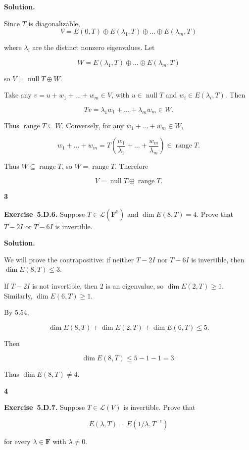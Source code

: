 \documentclass[11pt]{article}
\newcommand{\ProblemDivider}[1]{%
  \vspace{1.0em}
  \noindent\textbf{#1}\par
  \vspace{0.35em}
}
\newcommand{\ProblemAnnounce}{\noindent}
\newcommand{\SolutionAnnounce}{\noindent\textbf{Solution.}\par\medskip}
\newcommand{\Exercise}[1]{\textbf{Exercise~#1.}\;}
\DeclareMathOperator{\Range}{range}
\DeclareMathOperator{\Null}{null}
\begin{document}
\begin{solutionBox}
\SolutionAnnounce
\doublespacing
Since \(T\) is diagonalizable,
\[
V = E(0, T) \oplus E(\lambda_1, T) \oplus \dots \oplus E(\lambda_m, T)
\]

where \(\lambda_i\) are the distinct nonzero eigenvalues. Let

\[
W = E(\lambda_1, T) \oplus \dots \oplus E(\lambda_m, T)
\]

so \(V = \Null T \oplus W\).

Take any \(v = u + w_1 + \dots + w_m \in V\), with \(u \in \Null T\) and \(w_i \in E(\lambda_i, T)\). Then

\[
Tv = \lambda_1 w_1 + \dots + \lambda_m w_m \in W.
\]

Thus \(\Range T \subseteq W\). Conversely, for any \(w_1 + \dots + w_m \in W\),

\[
w_1 + \dots + w_m =
T\left(
\frac{w_1}{\lambda_1} + \dots + \frac{w_m}{\lambda_m}
\right)
\in \Range T.
\]

Thus \(W \subseteq \Range T\), so \(W = \Range T\). Therefore

\[
V = \Null T \oplus \Range T.
\]
\end{solutionBox}

\ProblemDivider{3}

\begin{problemBox}
\ProblemAnnounce
\Exercise{5.D.6}
Suppose \(T \in \mathcal{L}(\mathbf{F}^5)\) and \(\dim E(8, T) = 4\). Prove that \(T - 2I\) or \(T - 6I\) is invertible.
\end{problemBox}

\begin{solutionBox}
\SolutionAnnounce
\doublespacing
We will prove the contrapositive: if neither \(T-2I\) nor \(T-6I\) is invertible, then \(\dim E(8, T) \le 3\).

If \(T-2I\) is not invertible, then \(2\) is an eigenvalue, so \(\dim E(2, T) \ge 1\). Similarly, \(\dim E(6, T) \ge 1\).

By 5.54,

\[
\dim E(8, T) + \dim E(2, T) + \dim E(6, T) \le 5.
\]

Then

\[
\dim E(8, T) \le 5 - 1 - 1 = 3.
\]

Thus \(\dim E(8, T) \neq 4\).
\end{solutionBox}

\ProblemDivider{4}

\begin{problemBox}
\ProblemAnnounce
\Exercise{5.D.7}
Suppose \(T \in \mathcal{L}(V)\) is invertible. Prove that

\[
E(\lambda, T) = E(1/\lambda , T^{-1})
\]

for every \(\lambda \in \mathbf{F}\) with \(\lambda \neq 0\).
\end{problemBox}
\end{document}
